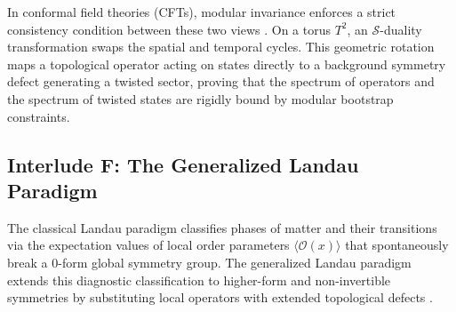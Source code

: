 \documentclass[aps,preprint,nofootinbib,preprintnumbers,eqsecnum,superscriptaddress]{revtex4}
\numberwithin{equation}{section}
\begin{document}
In conformal field theories (CFTs), modular invariance enforces a strict consistency condition between these two views \cite{McGreevy_2023}. On a torus $T^2$, an $\mathcal{S}$-duality transformation swaps the spatial and temporal cycles. This geometric rotation maps a topological operator acting on states directly to a background symmetry defect generating a twisted sector, proving that the spectrum of operators and the spectrum of twisted states are rigidly bound by modular bootstrap constraints.

\subsection{Interlude F: The Generalized Landau Paradigm} 
\label{sec:landau_paradigm}

The classical Landau paradigm classifies phases of matter and their transitions via the expectation values of local order parameters $\langle \mathcal{O}(x) \rangle$ that spontaneously break a $0$-form global symmetry group. The generalized Landau paradigm extends this diagnostic classification to higher-form and non-invertible symmetries by substituting local operators with extended topological defects \cite{McGreevy_2023}.
\end{document}
